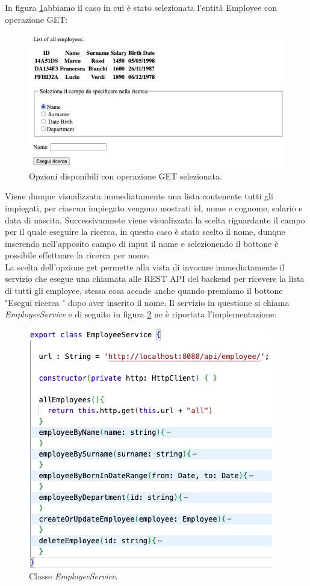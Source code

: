 In figura \ref{get-employee}abbiamo il caso in cui è stato selezionata l'entità Employee con operazione GET:
\FloatBarrier
\begin{figure}[!ht]
\centering
\includegraphics[width=0.7\linewidth]{immagini/getEmployee.png}
\caption{Opzioni disponibili con operazione GET selezionata.}
\label{get-employee}
\end{figure}
\FloatBarrier
Viene dunque visualizzata immediatamente una lista contenente tutti gli impiegati, per ciascun impiegato vengono mostrati id, nome e cognome, salario e data di nascita. Successivamnete viene visualizzata la scelta riguardante il campo per il quale eseguire la ricerca, in questo caso è stato scelto il nome, dunque inserendo nell'apposito campo di input il nome e selezionendo il bottone è possibile effettuare la ricerca per nome.\\
La scelta dell'opzione get permette alla vista di invocare immediatamente il servizio che esegue una chiamata alle REST API del backend per ricevere la lista di tutti gli employee, stessa cosa accade anche quando premiamo il bottone "Esegui ricerca " dopo aver inserito il nome. Il servizio in questione si chiama \textit{EmployeeService} e di seguito in figura \ref{employee-service} ne è riportata l'implementazione:
\FloatBarrier
\begin{figure}[!ht]
\centering
\includegraphics[width=0.6\linewidth]{immagini/employeeService.png}
\caption{Classe \textit{EmployeeService}.}
\label{employee-service}
\end{figure}
